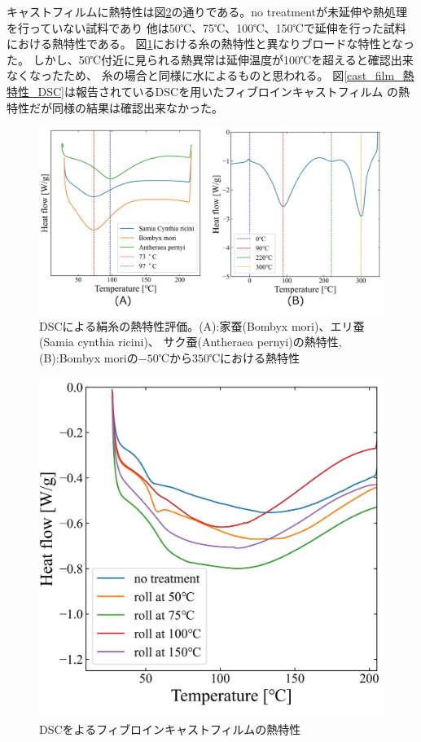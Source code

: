 \documentclass[dvipdfmx,12pt,a4paper]{jreport}
\begin{document}
	キャストフィルムに熱特性は図\ref{cast_film_DSC}の通りである。no treatmentが未延伸や熱処理を行っていない試料であり
	他は50℃、75℃、100℃、150℃で延伸を行った試料における熱特性である。
	図\ref{DSC熱特性評価}における糸の熱特性と異なりブロードな特性となった。
	しかし、50℃付近に見られる熱異常は延伸温度が100℃を超えると確認出来なくなったため、
	糸の場合と同様に水によるものと思われる。
	図\ref{cast_film_熱特性_DSC}は報告されているDSCを用いたフィブロインキャストフィルム
	の熱特性だが同様の結果は確認出来なかった。
	\begin{figure}[h]
		\centering
		\includegraphics[scale=0.8]{DSC_silk_0112_2.jpg}
		\caption{DSCによる絹糸の熱特性評価。(A):家蚕(Bombyx mori)、エリ蚕(Samia cynthia ricini)、
		サク蚕(Antheraea pernyi)の熱特性, (B):Bombyx moriの$-50$℃から$350$℃における熱特性}
		\label{DSC熱特性評価}
	\end{figure}
	\newpage
	\begin{figure}[h]
		\centering
		\includegraphics[scale=1]{cast_film_DSC_20210621.jpg}
		\caption{DSCをよるフィブロインキャストフィルムの熱特性}
		\label{cast_film_DSC}
	\end{figure}
\end{document}
